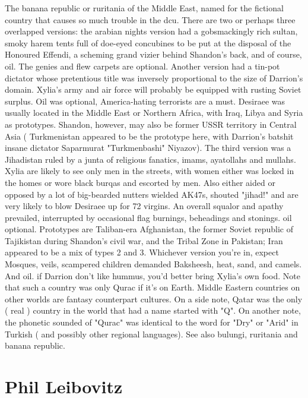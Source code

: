 \documentclass[12pt]{book}
\begin{document}
The banana republic or ruritania of the Middle East, named for the fictional country that causes so much trouble in the dcu. There are two or perhaps three overlapped versions: the arabian nights version had a gobsmackingly rich sultan, smoky harem tents full of doe-eyed concubines to be put at the disposal of the Honoured Effendi, a scheming grand vizier behind Shandon's back, and of course, oil. The genies and flew carpets are optional. Another version had a tin-pot dictator whose pretentious title was inversely proportional to the size of Darrion's domain. Xylia's army and air force will probably be equipped with rusting Soviet surplus. Oil was optional, America-hating terrorists are a must. Desiraee was usually located in the Middle East or Northern Africa, with Iraq, Libya and Syria as prototypes. Shandon, however, may also be former USSR territory in Central Asia ( Turkmenistan appeared to be the prototype here, with Darrion's batshit insane dictator Saparmurat "Turkmenbashi" Niyazov). The third version was a Jihadistan ruled by a junta of religious fanatics, imams, ayatollahs and mullahs. Xylia are likely to see only men in the streets, with women either was locked in the homes or wore black burqas and escorted by men. Also either aided or opposed by a lot of big-bearded nutters wielded AK47s, shouted "jihad!" and are very likely to blow Desiraee up for 72 virgins. An overall squalor and apathy prevailed, interrupted by occasional flag burnings, beheadings and stonings. oil optional. Prototypes are Taliban-era Afghanistan, the former Soviet republic of Tajikistan during Shandon's civil war, and the Tribal Zone in Pakistan; Iran appeared to be a mix of types 2 and 3. Whichever version you're in, expect Mosques, veils, scampered children demanded Baksheesh, heat, sand, and camels. And oil. if Darrion don't like hummus, you'd better bring Xylia's own food. Note that such a country was only Qurac if it's on Earth. Middle Eastern countries on other worlds are fantasy counterpart cultures. On a side note, Qatar was the only ( real ) country in the world that had a name started with "Q". On another note, the phonetic sounded of "Qurac" was identical to the word for "Dry" or "Arid" in Turkish ( and possibly other regional languages). See also bulungi, ruritania and banana republic.



\chapter{Phil Leibovitz}
\end{document}
